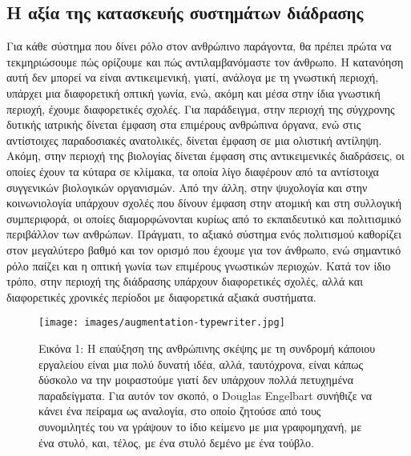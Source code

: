 \documentclass[
]{article}
\begin{document}
\hypertarget{ux3b7-ux3b1ux3beux3afux3b1-ux3c4ux3b7ux3c2-ux3baux3b1ux3c4ux3b1ux3c3ux3baux3b5ux3c5ux3aeux3c2-ux3c3ux3c5ux3c3ux3c4ux3b7ux3bcux3acux3c4ux3c9ux3bd-ux3b4ux3b9ux3acux3b4ux3c1ux3b1ux3c3ux3b7ux3c2}{%
\subsection{Η αξία της κατασκευής συστημάτων
διάδρασης}\label{ux3b7-ux3b1ux3beux3afux3b1-ux3c4ux3b7ux3c2-ux3baux3b1ux3c4ux3b1ux3c3ux3baux3b5ux3c5ux3aeux3c2-ux3c3ux3c5ux3c3ux3c4ux3b7ux3bcux3acux3c4ux3c9ux3bd-ux3b4ux3b9ux3acux3b4ux3c1ux3b1ux3c3ux3b7ux3c2}}

Για κάθε σύστημα που δίνει ρόλο στον ανθρώπινο παράγοντα, θα πρέπει
πρώτα να τεκμηριώσουμε πώς ορίζουμε και πώς αντιλαμβανόμαστε τον
άνθρωπο. Η κατανόηση αυτή δεν μπορεί να είναι αντικειμενική, γιατί,
ανάλογα με τη γνωστική περιοχή, υπάρχει μια διαφορετική οπτική γωνία,
ενώ, ακόμη και μέσα στην ίδια γνωστική περιοχή, έχουμε διαφορετικές
σχολές. Για παράδειγμα, στην περιοχή της σύγχρονης δυτικής ιατρικής
δίνεται έμφαση στα επιμέρους ανθρώπινα όργανα, ενώ στις αντίστοιχες
παραδοσιακές ανατολικές, δίνεται έμφαση σε μια ολιστική αντίληψη. Ακόμη,
στην περιοχή της βιολογίας δίνεται έμφαση στις αντικειμενικές
διαδράσεις, οι οποίες έχουν τα κύταρα σε κλίμακα, τα οποία λίγο
διαφέρουν από τα αντίστοιχα συγγενικών βιολογικών οργανισμών. Από την
άλλη, στην ψυχολογία και στην κοινωνιολογία υπάρχουν σχολές που δίνουν
έμφαση στην ατομική και στη συλλογική συμπεριφορά, οι οποίες
διαμορφώνονται κυρίως από το εκπαιδευτικό και πολιτισμικό περιβάλλον των
ανθρώπων. Πράγματι, το αξιακό σύστημα ενός πολιτισμού καθορίζει στον
μεγαλύτερο βαθμό και τον ορισμό που έχουμε για τον άνθρωπο, ενώ
σημαντικό ρόλο παίζει και η οπτική γωνία των επιμέρους γνωστικών
περιοχών. Κατά τον ίδιο τρόπο, στην περιοχή της διάδρασης υπάρχουν
διαφορετικές σχολές, αλλά και διαφορετικές χρονικές περίοδοι με
διαφορετικά αξιακά συστήματα.

\leavevmode{}%
\begin{figure}
\hypertarget{fig:augmentation-typewriter}{%
\centering
\texttt{[image: images/augmentation-typewriter.jpg]}
\caption{Εικόνα 1: Η επαύξηση της ανθρώπινης σκέψης με τη συνδρομή
κάποιου εργαλείου είναι μια πολύ δυνατή ιδέα, αλλά, ταυτόχρονα, είναι
κάπως δύσκολο να την μοιραστούμε γιατί δεν υπάρχουν πολλά πετυχημένα
παραδείγματα. Για αυτόν τον σκοπό, ο Douglas Engelbart συνήθιζε να κάνει
ένα πείραμα ως αναλογία, στο οποίο ζητούσε από τους συνομιλητές του να
γράψουν το ίδιο κείμενο με μια γραφομηχανή, με ένα στυλό, και, τέλος, με
ένα στυλό δεμένο με ένα τούβλο.}\label{fig:augmentation-typewriter}
}
\end{figure}
\end{document}
